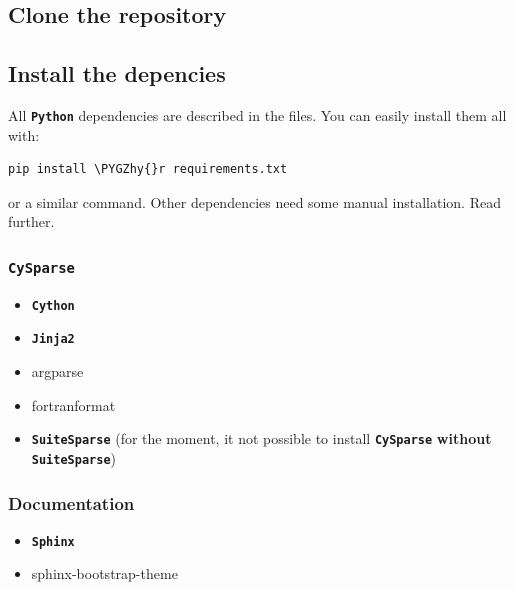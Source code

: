 \documentclass[letterpaper,10pt,english]{sphinxmanual}
\def\PYGZhy{\char`\-}
\begin{document}
\subsection{Clone the repository}
\label{installation:clone-the-repository}

\subsection{Install the depencies}
\label{installation:install-the-depencies}
All \textbf{\texttt{Python}} dependencies are described in the  files. You can easily install them all with:

\begin{Verbatim}[commandchars=\\\{\}]
pip install \PYGZhy{}r requirements.txt
\end{Verbatim}

or a similar command. Other dependencies need some manual installation. Read further.


\subsubsection{\textbf{\texttt{CySparse}}}
\label{installation:cysparse}\begin{itemize}
\item {} 
\textbf{\texttt{Cython}}

\item {} 
\textbf{\texttt{Jinja2}}

\item {} 
argparse

\item {} 
fortranformat

\item {} 
\textbf{\texttt{SuiteSparse}} (for the moment, it not possible to install \textbf{\texttt{CySparse}} \textbf{without} \textbf{\texttt{SuiteSparse}})

\end{itemize}


\subsubsection{Documentation}
\label{installation:documentation}\begin{itemize}
\item {} 
\textbf{\texttt{Sphinx}}

\item {} 
sphinx-bootstrap-theme

\end{itemize}
\end{document}
